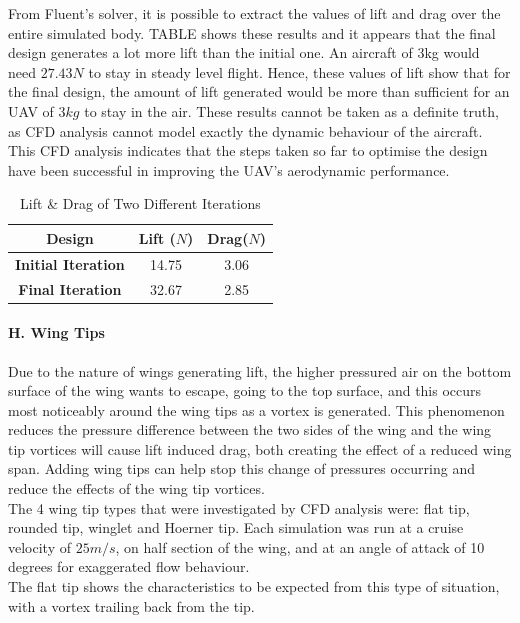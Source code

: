 \documentclass[12pt]{article}
\begin{document}
\noindent From Fluent’s solver, it is possible to extract the values of lift and drag over the entire simulated body. TABLE shows these results and it appears that the final design generates a lot more lift than the initial one. An aircraft of 3kg would need $27.43N$ to stay in steady level flight. Hence, these values of lift show that for the final design, the amount of lift generated would be more than sufficient for an UAV of $3kg$ to stay in the air. These results cannot be taken as a definite truth, as CFD analysis cannot model exactly the dynamic behaviour of the aircraft. This CFD analysis indicates that the steps taken so far to optimise the design have been successful in improving the UAV’s aerodynamic performance. \\

\begin{table}
\begin{tabular}{|c|c|c|}
\hline
\textbf{Design} & \textbf{Lift ($N$)} & \textbf{Drag($N$)} \\
\hline
\textbf{Initial Iteration} & 14.75 & 3.06 \\
\hline
\textbf{Final Iteration} & 32.67 & 2.85 \\
\hline
\end{tabular}
\caption{Lift \& Drag of Two Different Iterations}
\end{table}

\paragraph{H. Wing Tips} Due to the nature of wings generating lift, the higher pressured air on the bottom surface of the wing wants to escape, going to the top surface, and this occurs most noticeably around the wing tips as a vortex is generated. This phenomenon reduces the pressure difference between the two sides of the wing and the wing tip vortices will cause lift induced drag, both creating the effect of a reduced wing span. Adding wing tips can help stop this change of pressures occurring and reduce the effects of the wing tip vortices. \\

\noindent The 4 wing tip types that were investigated by CFD analysis were: flat tip, rounded tip, winglet and Hoerner tip. Each simulation was run at a cruise velocity of $25m/s$, on half section of the wing, and at an angle of attack of 10 degrees for exaggerated flow behaviour. \\

\noindent The flat tip shows the characteristics to be expected from this type of situation, with a vortex trailing back from the tip. \\
\end{document}
